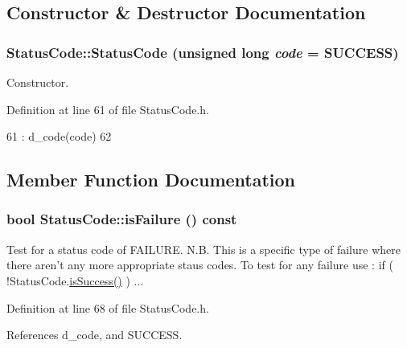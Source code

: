 \subsection{Constructor \& Destructor Documentation}
\hypertarget{classStatusCode_aaf803a555dd2d841418328a747059b3e}{
\subsubsection[{StatusCode}]{\setlength{\rightskip}{0pt plus 5cm}StatusCode::StatusCode (unsigned long {\em code} = {\ttfamily SUCCESS})}}
\label{classStatusCode_aaf803a555dd2d841418328a747059b3e}


Constructor. 

Definition at line 61 of file StatusCode.h.


\begin{DoxyCode}
61                                                   : d_code(code) {
62 }
\end{DoxyCode}


\subsection{Member Function Documentation}
\hypertarget{classStatusCode_aa5d4d426deef86d8595b08abf6efa5f7}{
\subsubsection[{isFailure}]{\setlength{\rightskip}{0pt plus 5cm}bool StatusCode::isFailure () const}}
\label{classStatusCode_aa5d4d426deef86d8595b08abf6efa5f7}
Test for a status code of FAILURE. N.B. This is a specific type of failure where there aren't any more appropriate staus codes. To test for any failure use : if ( !StatusCode.\hyperlink{classStatusCode_aa9517f7106b77565d0eda20a9b37e705}{isSuccess()} ) ... 

Definition at line 68 of file StatusCode.h.

References d\_\-code, and SUCCESS.


